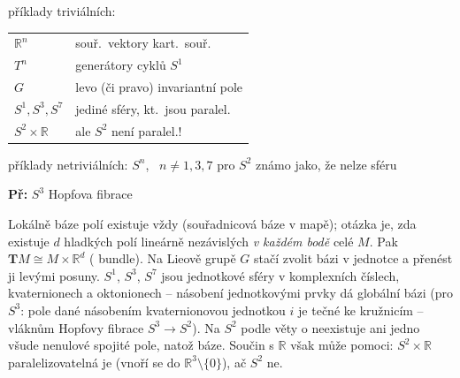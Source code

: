 
příklady triviálních:
\begin{center}
\begin{tabular}{ll}
  $\mathbb{R}^n$ & souř.\ vektory kart.\ souř. \\
  $T^n$ & generátory cyklů $S^1$ \\
  $G$ & levo (či pravo) invariantní pole \\
  $S^1, S^3, S^7$ & jediné sféry, kt.\ jsou paralel. \\
  $S^2\times\mathbb{R}$ & ale $S^2$ není paralel.!
\end{tabular}
\end{center}

příklady netriviálních:
\quad $S^n$, \ $n\neq 1,3,7$ \qquad pro $S^2$ známo jako, že nelze  sféru

\textbf{Př:} $S^3$ \quad Hopfova fibrace

\begin{vysvetleni}[Paralelizovatelnost]
Lokálně báze polí existuje vždy (souřadnicová báze v mapě); otázka je, zda existuje $d$ hladkých polí lineárně nezávislých \emph{v každém bodě} celé $M$. Pak $\mathbf{T}M\cong M\times\mathbb{R}^d$ ( bundle). Na Lieově grupě $G$ stačí zvolit bázi v jednotce a přenést ji levými posuny. $S^1$, $S^3$, $S^7$ jsou jednotkové sféry v komplexních číslech, kvaternionech a oktonionech -- násobení jednotkovými prvky dá globální bázi (pro $S^3$: pole dané násobením kvaternionovou jednotkou $i$ je tečné ke kružnicím -- vláknům Hopfovy fibrace $S^3\to S^2$). Na $S^2$ podle věty o  neexistuje ani jedno všude nenulové spojité pole, natož báze. Součin s $\mathbb{R}$ však může pomoci: $S^2\times\mathbb{R}$ paralelizovatelná je (vnoří se do $\mathbb{R}^3\setminus\{0\}$), ač $S^2$ ne.
\end{vysvetleni}

